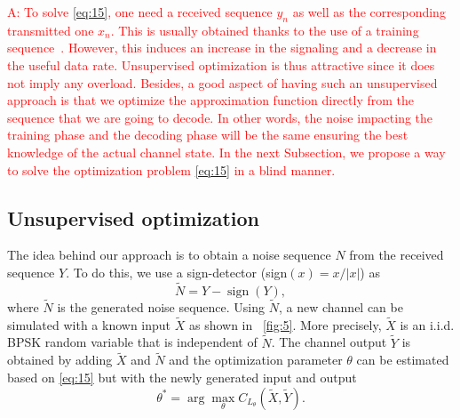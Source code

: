 \documentclass[a4paper]{IEEEtran}
\DeclareMathOperator\sign{sign}
\begin{document}
\textcolor{red}{A: To solve \eqref{eq:15}, one need
  a received sequence $y_n$ as well as the corresponding
  transmitted one $x_n$. This is usually obtained thanks to
  the use of a training sequence~\cite{VALG-2016}. However,
  this induces an increase in the signaling and a decrease
  in the useful data rate. Unsupervised optimization is thus
  attractive since it does not imply any overload. Besides,
  a good aspect of having such an unsupervised approach is
  that we optimize the approximation function directly from
  the sequence that we are going to decode. In other words,
  the noise impacting the training phase and the decoding
  phase will be the same ensuring the best knowledge of the
  actual channel state. In the next Subsection, we propose
  a way to solve the optimization problem \eqref{eq:15} in
  a blind manner.}
\subsection{Unsupervised optimization}\label{subsection:UnsupOpt}

The idea behind our approach is to obtain a noise sequence
$N$ from the received sequence $Y$. To do this, we use
a sign-detector (sign$(x)=x/\left|x\right|$) as
\begin{equation}
  \label{eq:16}
  \widetilde{N}= Y-\sign(Y),
\end{equation}
where $\widetilde{N}$ is the generated noise sequence. Using
$\widetilde{N}$, a new channel can be simulated with a known
input $\widetilde{X}$ as shown in \figurename~\ref{fig:5}.
More precisely, $\widetilde{X}$ is an i.i.d. BPSK random
variable that is independent of $\widetilde{N}$. The channel
output $\widetilde{Y}$ is obtained by adding $\widetilde{X}$
and $\widetilde{N}$ and the optimization parameter $\theta$
can be estimated based on \eqref{eq:15} but with the newly
generated input and output
\begin{equation}
  \label{eq:17}
  \theta^*=\arg\max_\theta C_{L_\theta}(\widetilde{X},\widetilde{Y}).
\end{equation}
\end{document}
